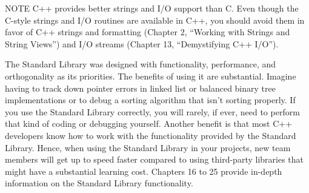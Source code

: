 \begin{myNotic}{NOTE}
C++ provides better strings and I/O support than C. Even though the C-style strings and I/O routines are available in C++, you should avoid them in favor of C++ strings and formatting (Chapter 2, “Working with Strings and String Views”) and I/O streams (Chapter 13, “Demystifying C++ I/O”).
\end{myNotic}


The Standard Library was designed with functionality, performance, and orthogonality as its priorities. The benefits of using it are substantial. Imagine having to track down pointer errors in linked list or balanced binary tree implementations or to debug a sorting algorithm that isn’t sorting properly. If you use the Standard Library correctly, you will rarely, if ever, need to perform that kind of coding or debugging yourself. Another benefit is that most C++ developers know how to work with the functionality provided by the Standard Library. Hence, when using the Standard Library in your projects, new team members will get up to speed faster compared to using third-party libraries that might have a substantial learning cost. Chapters 16 to 25 provide in-depth information on the Standard Library functionality.








